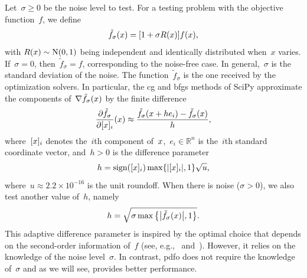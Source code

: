 \documentclass[
    smallextended,  %
    final,          %
]{svjour3}
\DeclareMathOperator{\sgn}{sign}
\newcommand{\abs}[2][]{#1\lvert#2#1\rvert}
\newcommand{\set}[2][]{#1\{#2#1\}}
\newcommand{\NN}{\mathrm{N}}
\newcommand{\R}{\mathbb{R}}
\newcommand{\iter}[1][k]{x\ifthenelse{\equal{#1}{}}{}{_{#1}}}
\newcommand{\obj}{f}
\newcommand{\modified}[1]{\texorpdfstring{{\color{RoyalBlue}#1}}{#1}}
\begin{document}
Let~$\sigma \ge 0$ be the noise level to test.
For a testing problem with the objective function~$\obj$, we define
\begin{equation}
    \label{eq:noisy-obj}
    \tilde{\obj}_\sigma(\iter[]) = [1 + \sigma R(\iter[])] \obj(\iter[]),
\end{equation}
with $R(\iter[])\sim \NN(0, 1)$ being independent and identically distributed when~$x$ varies.
If~$\sigma = 0$, then~$\tilde{f}_\sigma = f$, corresponding to the noise-free case.
In general,~$\sigma$ \modified{is} the standard deviation of the noise.
\modified{
    The function~$\tilde{\obj}_\sigma$ is the one received by the optimization solvers.
    In particular, the \gls{cg} and \gls{bfgs} methods of SciPy approximate the components of~$\nabla \tilde{\obj}_\sigma(\iter[])$ by the finite difference
    \begin{equation*}
        \frac{\partial \tilde{\obj}_\sigma}{\partial [{\iter[]}]_i}(\iter[]) \approx \frac{\tilde{\obj}_\sigma(\iter[] + h e_i) - \tilde{\obj}_\sigma(\iter[])}{h},
    \end{equation*}
    where~$[{\iter[]}]_i$ denotes the~$i$th component of~$\iter[]$,~$e_i \in \R^n$ is the~$i$th standard coordinate vector, and~$h > 0$ is the difference parameter
    \begin{equation}
        \label{eq:scipy-h}
        h = \sgn([{\iter[]}]_i) \max \set{\abs{[{\iter[]}]_i}, 1} \sqrt{u},
    \end{equation}
    where~$u \approx 2.2 \times 10^{-16}$ is the unit roundoff.
    When there is noise ($\sigma > 0$), we also test another value of~$h$, namely
    \begin{equation}
        \label{eq:adaptive-h}
        h = \sqrt{\sigma \max \set[\big]{\abs[\big]{\tilde{\obj}_\sigma(\iter[])}, 1}}.
    \end{equation}
    This adaptive difference parameter is inspired by the optimal choice that depends on the second-order information of~$\obj$ (see, e.g.,~\cite{More_Wild_2012} and~\cite[Equation~(2.2)]{Shi_Etal_2022a}).
    However, it relies on the knowledge of the noise level~$\sigma$.
    In contrast, \gls{pdfo} does not require the knowledge of~$\sigma$ and as we will see, provides better performance.
}
\end{document}
